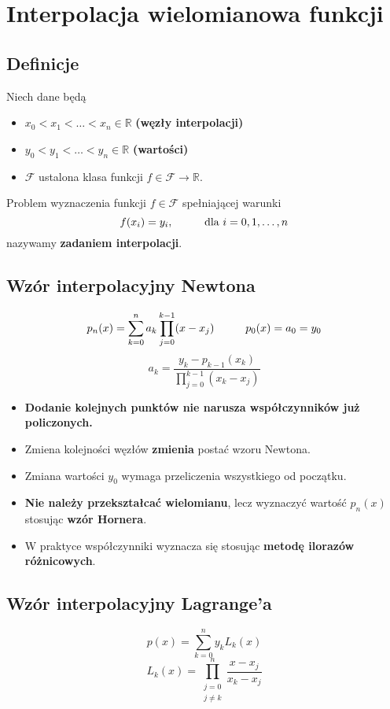 \documentclass[../mn-notatki.tex]{subfiles}
\begin{document}
\section{Interpolacja wielomianowa funkcji}

\subsection{Definicje}
\begin{tcolorbox}
Niech dane będą
\begin{itemize}
    \item $x_0 < x_1 < \ldots < x_n \in \mathbb{R}$ \textbf{(węzły interpolacji)}
    \item $y_0 < y_1 < \ldots < y_n \in \mathbb{R}$ \textbf{(wartości)}
    \item $\mathcal{F}$ ustalona klasa funkcji $f \in \mathcal{F} \rightarrow
    \mathbb{R}$.
\end{itemize}
Problem wyznaczenia funkcji $f \in \mathcal{F}$ spełniającej warunki
\[
f(x_i) = y_i, \hspace*{1cm} \text{dla } i = 0, 1, \ldots, n
\]
nazywamy \textbf{zadaniem interpolacji}.
\end{tcolorbox}

\subsection{Wzór interpolacyjny Newtona}
\begin{tcolorbox}
\[
p_n(x) = \sum_{k=0}^{n} a_k \prod_{j=0}^{k-1} (x-x_j)
\hspace*{1cm}
p_0(x) = a_0 = y_0
\]
\[
a_k = \frac{y_k - p_{k-1}(x_k)}{\prod_{j=0}^{k-1}(x_k - x_j)}
\]
\end{tcolorbox}

\begin{itemize}
    \item \textbf{Dodanie kolejnych punktów nie narusza współczynników już
    policzonych.}
    \item Zmiena kolejności węzłów \textbf{zmienia} postać wzoru Newtona.
    \item Zmiana wartości $y_0$ wymaga przeliczenia wszystkiego od początku.
    \item \textbf{Nie należy przekształcać wielomianu}, lecz wyznaczyć wartość
    $p_n(x)$ stosując \textbf{wzór Hornera}.
    \item W praktyce współczynniki wyznacza się stosując \textbf{metodę ilorazów
    różnicowych}.
\end{itemize}

\subsection{Wzór interpolacyjny Lagrange'a}
\begin{tcolorbox}
\[
p(x) = \sum_{k=0}^{n} y_k L_k(x)
\]
\[
L_k(x) = \prod_{\substack{j=0\\j\neq k}}^{n} \frac{x-x_j}{x_k-x_j}
\]
\end{tcolorbox}
\end{document}
